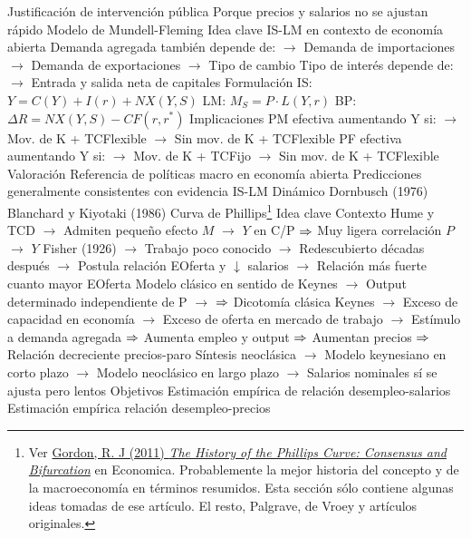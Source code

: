 \documentclass{nuevotema}
\begin{document}
\begin{esquemal}
				\4 Justificación de intervención pública
				\4[] Porque precios y salarios no se ajustan rápido
			\3 Modelo de Mundell-Fleming
				\4 Idea clave
				\4[] IS-LM en contexto de economía abierta
				\4[] Demanda agregada también depende de:
				\4[] $\to$ Demanda de importaciones
				\4[] $\to$ Demanda de exportaciones
				\4[] $\to$ Tipo de cambio
				\4[] Tipo de interés depende de:
				\4[] $\to$ Entrada y salida neta de capitales
				\4 Formulación
				\4[] IS: $Y = C(Y) + I(r) + NX(Y, S)$
				\4[] LM: $M_S = P \cdot L(Y,r)$
				\4[] BP: $\Delta R = NX(Y,S) - CF(r, r^*)$
				\4 Implicaciones
				\4[] PM efectiva aumentando Y si:
				\4[] $\to$ Mov. de K + TCFlexible
				\4[] $\to$ Sin mov. de K + TCFlexible
				\4[] PF efectiva aumentando Y si:
				\4[] $\to$ Mov. de K + TCFijo
				\4[] $\to$ Sin mov. de K + TCFlexible
				\4 Valoración
				\4[] Referencia de políticas macro en economía abierta
				\4[] Predicciones generalmente consistentes con evidencia
			\3 IS-LM Dinámico
				\4 Dornbusch (1976)
				\4 Blanchard y Kiyotaki (1986)
		\2 Curva de Phillips\footnote{Ver \href{http://economics.weinberg.northwestern.edu/robert-gordon/files/RescPapers/HistoryPhillipsCurve.pdf}{Gordon, R. J (2011) \textit{The History of the Phillips Curve: Consensus and Bifurcation}} en Economica. Probablemente la mejor historia del concepto y de la macroeconomía en términos resumidos. Esta sección sólo contiene algunas ideas tomadas de ese artículo. El resto, Palgrave, de Vroey y artículos originales.}
			\3 Idea clave
				\4 Contexto
				\4[] Hume y TCD
				\4[] $\to$ Admiten pequeño efecto $M$ $\to$ $Y$ en C/P
				\4[] $\Rightarrow$ Muy ligera correlación $P$ $\to$ $Y$
				\4[] Fisher (1926)
				\4[] $\to$ Trabajo poco conocido
				\4[] $\to$ Redescubierto décadas después
				\4[] $\to$ Postula relación EOferta y $\downarrow$ salarios
				\4[] $\to$ Relación más fuerte cuanto mayor EOferta
				\4[] Modelo clásico en sentido de Keynes
				\4[] $\to$ Output determinado independiente de P
				\4[] $\to$ $\Rightarrow$ Dicotomía clásica
				\4[] Keynes
				\4[] $\to$ Exceso de capacidad en economía
				\4[] $\to$ Exceso de oferta en mercado de trabajo
				\4[] $\to$ Estímulo a demanda agregada
				\4[] $\Rightarrow$ Aumenta empleo y output
				\4[] $\Rightarrow$ Aumentan precios
				\4[] $\Rightarrow$ Relación decreciente precios-paro
				\4[] Síntesis neoclásica
				\4[] $\to$ Modelo keynesiano en corto plazo
				\4[] $\to$ Modelo neoclásico en largo plazo
				\4[] $\to$ Salarios nominales sí se ajusta pero lentos
				\4 Objetivos
				\4[] Estimación empírica de relación desempleo-salarios
				\4[] Estimación empírica relación desempleo-precios

\end{esquemal}
\end{document}
